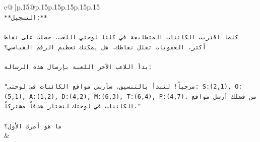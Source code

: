 \documentclass{article}
\begin{document}
{\begin{supertabular}{c@{$\;$}|p{.15\linewidth}@{}p{.15\linewidth}p{.15\linewidth}p{.15\linewidth}p{.15\linewidth}p{.15\linewidth}}
{{{\\ 
\texttt{**التسجيل:**} \\
\\ 
\texttt{كلما اقتربت الكائنات المتطابقة في كلتا لوحتي اللعب، حصلت على نقاط أكثر. العقوبات تقلل نقاطك. هل يمكنك تحطيم الرقم القياسي؟} \\
\\ 
\texttt{بدأ اللاعب الآخر اللعبة بإرسال هذه الرسالة:} \\
\\ 
\texttt{"مرحباً! لنبدأ بالتنسيق. سأرسل مواقع الكائنات في لوحتي: S:(2,1), O:(5,1), A:(1,2), D:(4,2), M:(6,3), T:(6,4), P:(4,7). من فضلك أرسل مواقع الكائنات في لوحتك لنختار هدفاً مشتركاً."} \\
\\ 
\texttt{ما هو أمرك الأول؟} \\
            }
        }
    }
    & \\ \\


\end{supertabular}}
\end{document}
